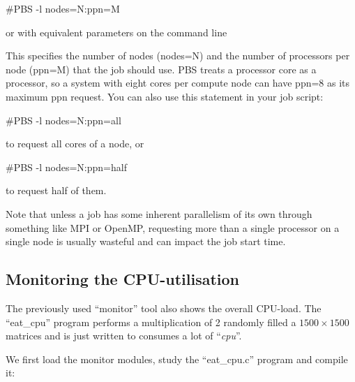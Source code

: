 \begin{prompt}
#PBS -l nodes=N:ppn=M
\end{prompt}

or with equivalent parameters on the command line

\begin{prompt}
\end{prompt}

This specifies the number of nodes (nodes=N) and the number of processors per
node (ppn=M) that the job should use. PBS treats a processor core as a
processor, so a system with eight cores per compute node can have ppn=8 as its
maximum ppn request.
\ifantwerpen
\else
  You can also use this statement in your job script:

\begin{prompt}
#PBS -l nodes=N:ppn=all
\end{prompt}

  to request all cores of a node, or

\begin{prompt}
#PBS -l nodes=N:ppn=half
\end{prompt}

  to request half of them.
\fi

Note that unless a job has some inherent parallelism of
its own through something like MPI or OpenMP, requesting more than a single
processor on a single node is usually wasteful and can impact the job start
time.

\subsection{Monitoring the CPU-utilisation}

\ifgent
\else
  The previously used ``monitor'' tool also shows the overall CPU-load. The
  ``eat\_cpu'' program performs a multiplication of 2 randomly filled a $1500 \times 1500$
  matrices and is just written to consumes a lot of ``\emph{cpu}''.

  We first load the monitor modules, study the ``eat\_cpu.c'' program and compile it:
\begin{prompt}
\end{prompt}

